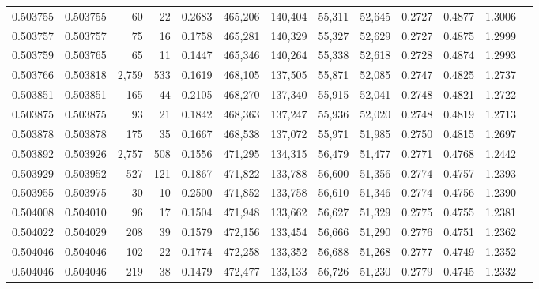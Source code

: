 \begin{tabular}{rrrrrrrrrrrrr}
0.503755 & 0.503755 &    60 &    22 &                                     0.2683 & 465,206 & 140,404 &  55,311 &  52,645 & 0.2727 & 0.4877 & 1.3006 \\
0.503757 & 0.503757 &    75 &    16 &                                     0.1758 & 465,281 & 140,329 &  55,327 &  52,629 & 0.2727 & 0.4875 & 1.2999 \\
0.503759 & 0.503765 &    65 &    11 &                                     0.1447 & 465,346 & 140,264 &  55,338 &  52,618 & 0.2728 & 0.4874 & 1.2993 \\
0.503766 & 0.503818 & 2,759 &   533 &                                     0.1619 & 468,105 & 137,505 &  55,871 &  52,085 & 0.2747 & 0.4825 & 1.2737 \\
0.503851 & 0.503851 &   165 &    44 &                                     0.2105 & 468,270 & 137,340 &  55,915 &  52,041 & 0.2748 & 0.4821 & 1.2722 \\
0.503875 & 0.503875 &    93 &    21 &                                     0.1842 & 468,363 & 137,247 &  55,936 &  52,020 & 0.2748 & 0.4819 & 1.2713 \\
0.503878 & 0.503878 &   175 &    35 &                                     0.1667 & 468,538 & 137,072 &  55,971 &  51,985 & 0.2750 & 0.4815 & 1.2697 \\
0.503892 & 0.503926 & 2,757 &   508 &                                     0.1556 & 471,295 & 134,315 &  56,479 &  51,477 & 0.2771 & 0.4768 & 1.2442 \\
0.503929 & 0.503952 &   527 &   121 &                                     0.1867 & 471,822 & 133,788 &  56,600 &  51,356 & 0.2774 & 0.4757 & 1.2393 \\
0.503955 & 0.503975 &    30 &    10 &                                     0.2500 & 471,852 & 133,758 &  56,610 &  51,346 & 0.2774 & 0.4756 & 1.2390 \\
0.504008 & 0.504010 &    96 &    17 &                                     0.1504 & 471,948 & 133,662 &  56,627 &  51,329 & 0.2775 & 0.4755 & 1.2381 \\
0.504022 & 0.504029 &   208 &    39 &                                     0.1579 & 472,156 & 133,454 &  56,666 &  51,290 & 0.2776 & 0.4751 & 1.2362 \\
0.504046 & 0.504046 &   102 &    22 &                                     0.1774 & 472,258 & 133,352 &  56,688 &  51,268 & 0.2777 & 0.4749 & 1.2352 \\
0.504046 & 0.504046 &   219 &    38 &                                     0.1479 & 472,477 & 133,133 &  56,726 &  51,230 & 0.2779 & 0.4745 & 1.2332 \\

\end{tabular}
